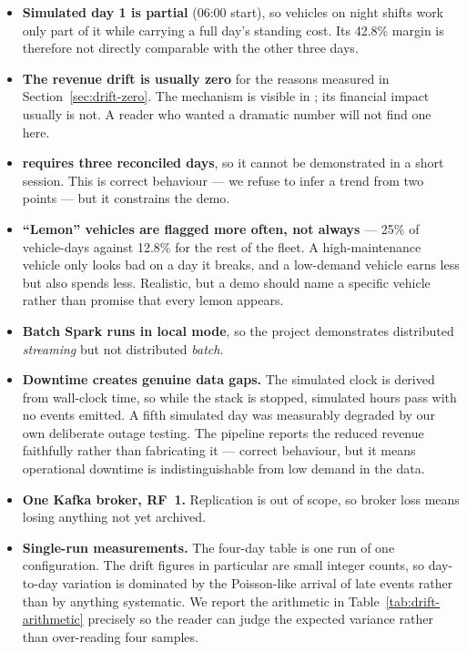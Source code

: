 \begin{itemize}
  \item \textbf{Simulated day 1 is partial} (06:00 start), so vehicles on
        night shifts work only part of it while carrying a full day's
        standing cost. Its 42.8\% margin is therefore not directly
        comparable with the other three days.
  \item \textbf{The revenue drift is usually zero} for the reasons
        measured in Section~\ref{sec:drift-zero}. The mechanism is
        visible in ; its
        financial impact usually is not. A reader who wanted a dramatic
        number will not find one here.
  \item \textbf{ requires three reconciled
        days}, so it cannot be demonstrated in a short session. This is
        correct behaviour --- we refuse to infer a trend from two points
        --- but it constrains the demo.
  \item \textbf{``Lemon'' vehicles are flagged more often, not always}
        --- 25\% of vehicle-days against 12.8\% for the rest of the fleet.
        A high-maintenance vehicle only looks bad on a day it breaks, and
        a low-demand vehicle earns less but also spends less. Realistic,
        but a demo should name a specific vehicle rather than promise
        that every lemon appears.
  \item \textbf{Batch Spark runs in local mode}, so the project
        demonstrates distributed \emph{streaming} but not distributed
        \emph{batch}.
  \item \textbf{Downtime creates genuine data gaps.} The simulated clock
        is derived from wall-clock time, so while the stack is stopped,
        simulated hours pass with no events emitted. A fifth simulated
        day was measurably degraded by our own deliberate outage testing.
        The pipeline reports the reduced revenue faithfully rather than
        fabricating it --- correct behaviour, but it means operational
        downtime is indistinguishable from low demand in the data.
  \item \textbf{One Kafka broker, RF~1.} Replication is out of scope, so
        broker loss means losing anything not yet archived.
  \item \textbf{Single-run measurements.} The four-day table is one run
        of one configuration. The drift figures in particular are small
        integer counts, so day-to-day variation is dominated by the
        Poisson-like arrival of late  events rather than
        by anything systematic. We report the arithmetic in
        Table~\ref{tab:drift-arithmetic} precisely so the reader can
        judge the expected variance rather than over-reading four
        samples.
\end{itemize}

